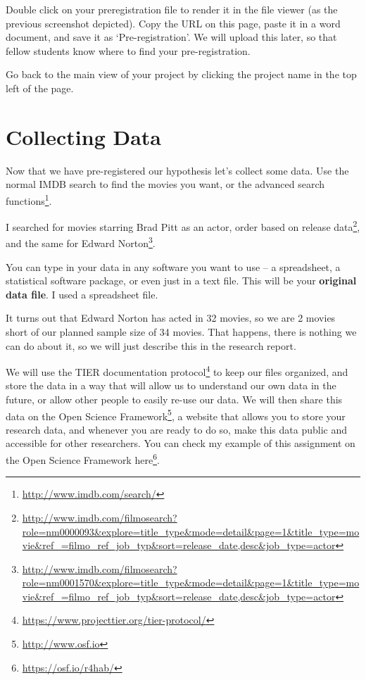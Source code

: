 \documentclass[
  oneside]{krantz}
\renewcommand{\href}[2]{#2\footnote{\url{#1}}}
\begin{document}
Double click on your preregistration file to render it in the file viewer (as
the previous screenshot depicted). Copy the URL on this page, paste it in a word
document, and save it as `Pre-registration'. We will upload this later, so that
fellow students know where to find your pre-registration.

Go back to the main view of your project by clicking the project name in the top
left of the page.

\hypertarget{collecting-data}{%
\section{Collecting Data}\label{collecting-data}}

Now that we have pre-registered our hypothesis let's collect some data. Use the
normal IMDB search to find the movies you want, or the \href{http://www.imdb.com/search/}{advanced search
functions}.

I searched for \href{http://www.imdb.com/filmosearch?role=nm0000093\&explore=title_type\&mode=detail\&page=1\&title_type=movie\&ref_=filmo_ref_job_typ\&sort=release_date,desc\&job_type=actor}{movies starring Brad Pitt as an actor, order based on release
data},
and \href{http://www.imdb.com/filmosearch?role=nm0001570\&explore=title_type\&mode=detail\&page=1\&title_type=movie\&ref_=filmo_ref_job_typ\&sort=release_date,desc\&job_type=actor}{the same for Edward
Norton}.

You can type in your data in any software you want to use -- a spreadsheet, a
statistical software package, or even just in a text file. This will be your
\textbf{original data file}. I used a spreadsheet file.

It turns out that Edward Norton has acted in 32 movies, so we are 2 movies short
of our planned sample size of 34 movies. That happens, there is nothing we can
do about it, so we will just describe this in the research report.

We will use the \href{https://www.projecttier.org/tier-protocol/}{TIER documentation
protocol} to keep our files
organized, and store the data in a way that will allow us to understand our own
data in the future, or allow other people to easily re-use our data. We
will then share this data on the \href{http://www.osf.io}{Open Science Framework}, a
website that allows you to store your research data, and whenever you are ready
to do so, make this data public and accessible for other researchers. You can
check my example of this assignment on the Open Science Framework
\href{https://osf.io/r4hab/}{here}.
\end{document}
